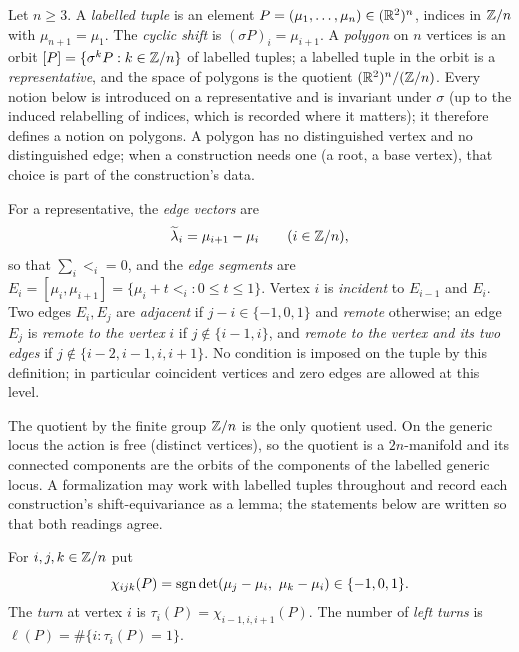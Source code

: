 \begin{definition}\label{def:polygon}
Let $n\geq3$. A \emph{labelled tuple} is an element
$P=(\mu_1,\ldots,\mu_n)\in(\mathbb R^2)^n$, indices in $\mathbb Z/n$ with $\mu_{n+1}=\mu_1$. The
\emph{cyclic shift} is $(\sigma P)_i=\mu_{i+1}$. A \emph{polygon} on $n$
vertices is an orbit $[P]=\{\sigma^kP:k\in\mathbb Z/n\}$ of labelled tuples; a
labelled tuple in the orbit is a \emph{representative}, and the space of
polygons is the quotient $(\mathbb R^2)^n/(\mathbb Z/n)$. Every notion below is
introduced on a representative and is invariant under $\sigma$ (up to the
induced relabelling of indices, which is recorded where it matters); it
therefore defines a notion on polygons. A polygon has no distinguished vertex
and no distinguished edge; when a construction needs one (a root, a base
vertex), that choice is part of the construction's data.

For a representative, the \emph{edge vectors} are
\[
\widetilde\lambda_i=\mu_{i+1}-\mu_i\qquad(i\in\mathbb Z/n),
\]
so that $\sum_i\lt_i=0$, and the \emph{edge segments} are
$E_i=[\mu_i,\mu_{i+1}]=\{\mu_i+t\lt_i:0\leq t\leq1\}$. Vertex $i$ is
\emph{incident} to $E_{i-1}$ and $E_i$. Two edges $E_i,E_j$ are
\emph{adjacent} if $j-i\in\{-1,0,1\}$ and \emph{remote} otherwise; an edge
$E_j$ is \emph{remote to the vertex} $i$ if $j\notin\{i-1,i\}$, and
\emph{remote to the vertex and its two edges} if $j\notin\{i-2,i-1,i,i+1\}$.
No condition is imposed on the tuple by this definition; in particular
coincident vertices and zero edges are allowed at this level.
\end{definition}

\begin{remark}[formalization]
The quotient by the finite group $\mathbb Z/n$ is the only quotient used. On the
generic locus the action is free (distinct vertices), so the quotient is a
$2n$-manifold and its connected components are the orbits of the components
of the labelled generic locus. A formalization may work with labelled tuples
throughout and record each construction's shift-equivariance as a lemma; the
statements below are written so that both readings agree.
\end{remark}

\begin{definition}\label{def:chirotope}
For $i,j,k\in\mathbb Z/n$ put
\[
\chi_{ijk}(P)=\sgn\det(\mu_j-\mu_i,\ \mu_k-\mu_i)\in\{-1,0,1\}.
\]
The \emph{turn} at vertex $i$ is $\tau_i(P)=\chi_{i-1,i,i+1}(P)$. The number
of \emph{left turns} is $\ell(P)=\#\{i:\tau_i(P)=1\}$.
\end{definition}

